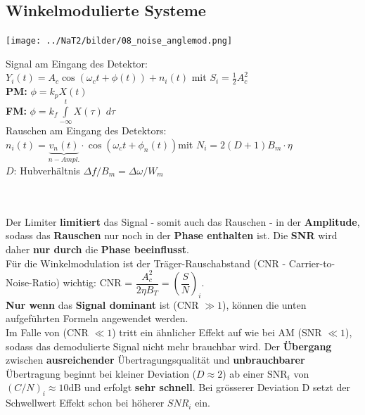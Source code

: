 \subsection{Winkelmodulierte Systeme }
\begin{minipage}{10cm}
	\texttt{[image: ../NaT2/bilder/08\_noise\_anglemod.png]}
\end{minipage}
\begin{minipage}{9cm}
	Signal am Eingang des Detektor:\\
	\hspace*{0.3cm} $Y_i(t) = A_c \cos(\omega_c t + \phi(t)) + n_i(t)$ \qquad mit \quad $S_i = \frac{1}{2} A_c^2$ \\
	\hspace*{0.6cm} \textbf{PM:} \quad $\phi = k_p X(t)$\\
	\hspace*{0.6cm} \textbf{FM:} \quad $\phi = k_f \int\limits_{-\infty}^{t} X(\tau) \; d\tau$ \\
	Rauschen am Eingang des Detektors:\\ 
	\hspace*{0.3cm} $n_i(t) = \underbrace{v_n(t)}_{n-Ampl.} \cdot \cos(\omega_c t + \phi_n(t))$\quad mit \quad $N_i = 2 (D+1)B_m\cdot\eta$\\
	\hspace*{0.6cm} $D$: \quad Hubverhältnis $\Delta f / B_m = \Delta \omega / W_m$
\end{minipage}\\ \\
Der Limiter \textbf{limitiert} das Signal - somit auch das Rauschen - in der \textbf{Amplitude}, 
sodass das \textbf{Rauschen} nur noch in der \textbf{Phase enthalten} ist. 
Die \textbf{SNR} wird daher \textbf{nur durch }die \textbf{Phase beeinflusst}. \\ 

Für die Winkelmodulation ist der Träger-Rauschabstand (CNR - Carrier-to-Noise-Ratio) wichtig: 
CNR = $ \dfrac{A_c^2}{2 \eta B_T} = \left(\dfrac{S}{N}\right)_i$. \\
\textbf{Nur wenn} das \textbf{Signal dominant} ist (CNR $\gg 1$), können die unten aufgeführten
Formeln angewendet werden. \\ 
Im Falle von (CNR $\ll 1$) tritt ein ähnlicher Effekt auf wie bei AM (SNR $\ll 1$), 
sodass das demodulierte Signal nicht mehr brauchbar wird. Der \textbf{Übergang} zwischen \textbf{ausreichender} Übertragungsqualität und \textbf{unbrauchbarer}  
Übertragung beginnt bei kleiner Deviation ($D \approx 2$) ab einer \unboldmath$ \text{SNR}_{i}$ von $(C/N)_i \approx 10 \text{dB} $ und erfolgt \textbf{sehr schnell}. Bei grösserer Deviation D setzt der Schwellwert Effekt schon bei höherer $SNR_i$ ein.


